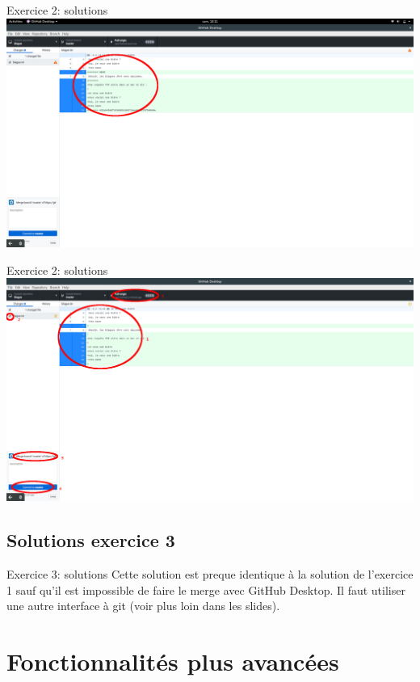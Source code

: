 \documentclass{beamer}
\begin{document}
\begin{frame}{Exercice 2: solutions}
    \centering
    \includegraphics[width=\textwidth]{img/image_exercices/conflic_to_resolve.png}
\end{frame}

\begin{frame}{Exercice 2: solutions}
	\centering
    \includegraphics[width=\textwidth]{img/image_exercices/conflic_resolv.png}
\end{frame}

\subsection{Solutions exercice 3}

\begin{frame}{Exercice 3: solutions}
    Cette solution est preque identique à la solution de l'exercice 1 sauf
    qu'il est impossible de faire le merge avec GitHub Desktop. Il faut
    utiliser une autre interface à git (voir plus loin dans les slides).
\end{frame}

\section{Fonctionnalités plus avancées}
\end{document}
